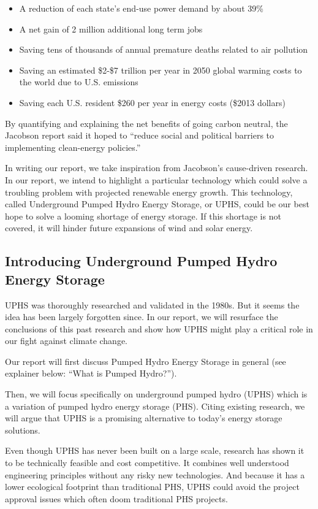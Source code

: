 \documentclass[hidelinks,12pt,a4paper]{article}
\begin{document}
{\footnotesize
\begin{itemize}
    \item A reduction of each state’s end-use power demand by about 39\%
    \item A net gain of 2 million additional long term jobs
    \item Saving tens of thousands of annual premature deaths related to air pollution
    \item Saving an estimated \$2-\$7 trillion per year in 2050 global warming costs to the world due to U.S. emissions
    \item Saving each U.S. resident \$260 per year in energy costs (\$2013 dollars)
\end{itemize}
}

By quantifying and explaining the net benefits of going carbon neutral, the Jacobson report said it hoped to “reduce social and political barriers to implementing clean-energy policies.” \cite{100PercCleanAndRenewableEnergyBy2050}

In writing our report, we take inspiration from Jacobson's cause-driven research. In our report, we intend to highlight a particular technology which could solve a troubling problem with projected renewable energy growth. This technology, called Underground Pumped Hydro Energy Storage, or UPHS, could be our best hope to solve a looming shortage of energy storage. If this shortage is not covered, it will hinder future expansions of wind and solar energy.

\subsection{Introducing Underground Pumped Hydro Energy Storage}
UPHS was thoroughly researched and validated in the 1980s. But it seems the idea has been largely forgotten since. In our report, we will resurface the conclusions of this past research and show how UPHS might play a critical role in our fight against climate change.

Our report will first discuss Pumped Hydro Energy Storage in general (see explainer below: “What is Pumped Hydro?”).

Then, we will focus specifically on underground pumped hydro (UPHS) which is a variation of pumped hydro energy storage (PHS). Citing existing research, we will argue that UPHS is a promising alternative to today's energy storage solutions.

Even though UPHS has never been built on a large scale, research has shown it to be technically feasible and cost competitive. It combines well understood engineering principles without any risky new technologies. And because it has a lower ecological footprint than traditional PHS, UPHS could avoid the project approval issues which often doom traditional PHS projects.
\end{document}
